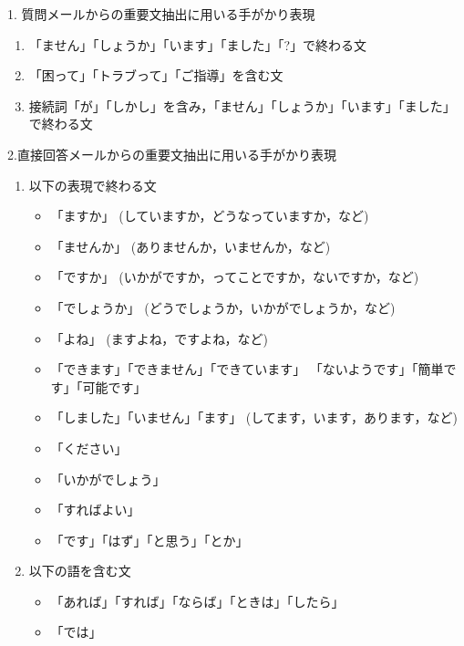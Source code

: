   \begin{table}[tbp]
   \begin{center}
    \caption{メーリングリストに投稿されたメールからの重要文抽出に用いる手がかり表現}
    \label{tab:重要文抽出に用いた手がかり表現}
 
    \vspace{3mm}

    1. 質問メールからの重要文抽出に用いる手がかり表現
    \begin{enumerate}
     \item 「ません」「しょうか」「います」「ました」「?」で終わる文
     \item 「困って」「トラブって」「ご指導」を含む文
     \item 接続詞「が」「しかし」を含み，「ません」「しょうか」「います」「ました」で終わる文
    \end{enumerate}
    
    \vspace{4mm}

    2.直接回答メールからの重要文抽出に用いる手がかり表現
    \begin{enumerate}
     \item 以下の表現で終わる文
	   \begin{itemize}
	    \item 「ますか」
		  (していますか，どうなっていますか，など)
	    \item 「ませんか」
		  (ありませんか，いませんか，など)
	    \item 「ですか」
		  (いかがですか，ってことですか，ないですか，など)
	    \item 「でしょうか」
		  (どうでしょうか，いかがでしょうか，など)
	    \item 「よね」
		  (ますよね，ですよね，など)
	    \item 「できます」「できません」「できています」
		  「ないようです」「簡単です」「可能です」
	    \item 「しました」「いません」「ます」
		  (してます，います，あります，など)
	    \item 「ください」
	    \item 「いかがでしょう」
	    \item 「すればよい」
	    \item 「です」「はず」「と思う」「とか」
	   \end{itemize}

     \item 以下の語を含む文
	   \begin{itemize}
	    \item 「あれば」「すれば」「ならば」「ときは」「したら」
	    \item 「では」
	   \end{itemize}


\end{enumerate}
\end{center}
\end{table}
